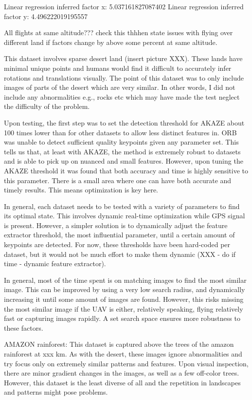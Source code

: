 Linear regression inferred factor x: 5.037161827087402
Linear regression inferred factor y: 4.496222019195557

All flights at same altitude??? check this thhhen state issues with flying over different land if factors change by above some percent at same altitude. 



This dataset involves sparse desert land (insert picture XXX). These lands have minimal unique points and humans would find it difficult to accurately infer rotations and translations visually. The point of this dataset was to only include images of parts of the desert which are very similar. In other words, I did not include any abnormalities e.g., rocks etc which may have made the test neglect the difficulty of the problem. 

Upon testing, the first step was to set the detection threshold for AKAZE about 100 times lower than for other datasets to allow less distinct features in. ORB was unable to detect sufficient quality keypoints given any parameter set. This tells us that, at least with AKAZE, the method is extremely robust to datasets and is able to pick up on nuanced and small features. However, upon tuning the AKAZE threshold it was found that both accuracy and time is highly sensitive to this parameter. There is a small area where one can have both accurate and timely results. This means optimization is key here. 

In general, each dataset needs to be tested with a variety of parameters to find its optimal state. This involves dynamic real-time optimization while GPS signal is present. However, a simpler solution is to dynamically adjust the feature extractor threshold, the most influential parameter, until a certain amount of keypoints are detected. For now, these thresholds have been hard-coded per dataset, but it would not be much effort to make them dynamic (XXX - do if time - dynamic feature extractor). 

In general, most of the time spent is on matching images to find the most similar image. This can be improved by using a very low search radius, and dynamically increasing it until some amount of images are found. However, this risks missing the most similar image if the UAV is either, relatively speaking, flying relatively fast or capturing images rapidly. A set search space ensures more robustness to these factors.





AMAZON rainforest:
This dataset is captured above the trees of the amazon rainforest at xxx km. As with the desert, these images ignore abnormalities and try focus only on extremely similar patterns and features. Upon visual inspection, there are minor gradient changes in the images, as well as a few off-color trees. However, this dataset is the least diverse of all and the repetition in landscapes and patterns might pose problems. 




